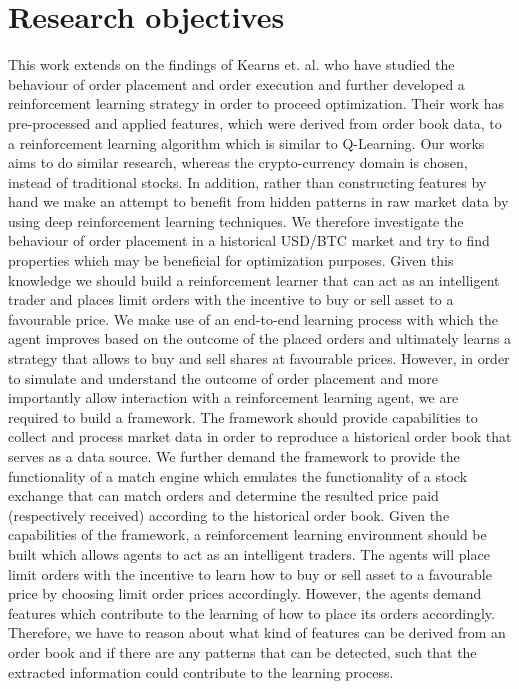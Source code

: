 \section{Research objectives}

This work extends on the findings of Kearns et. al. \cite{nevmyvaka2006reinforcement} who have studied the behaviour of order placement and order execution and further developed a reinforcement learning strategy in order to proceed optimization.
Their work has pre-processed and applied features, which were derived from order book data, to a reinforcement learning algorithm which is similar to Q-Learning.
Our works aims to do similar research, whereas the crypto-currency domain is chosen, instead of traditional stocks.
In addition, rather than constructing features by hand we make an attempt to benefit from hidden patterns in raw market data by using deep reinforcement learning techniques.
We therefore investigate the behaviour of order placement in a historical USD/BTC market and try to find properties which may be beneficial for optimization purposes.
Given this knowledge we should build a reinforcement learner that can act as an intelligent trader and places limit orders with the incentive to buy or sell asset to a favourable price.
We make use of an end-to-end learning process with which the agent improves based on the outcome of the placed orders and ultimately learns a strategy that allows to buy and sell shares at favourable prices.
However, in order to simulate and understand the outcome of order placement and more importantly allow interaction with a reinforcement learning agent, we are required to build a framework.
The framework should provide capabilities to collect and process market data in order to reproduce a historical order book that serves as a data source.
We further demand the framework to provide the functionality of a match engine which emulates the functionality of a stock exchange that can match orders and determine the resulted price paid (respectively received) according to the historical order book.
Given the capabilities of the framework, a reinforcement learning environment should be built which allows agents to act as an intelligent traders.
The agents will place limit orders with the incentive to learn how to buy or sell asset to a favourable price by choosing limit order prices accordingly.
However, the agents demand features which contribute to the learning of how to place its orders accordingly.
Therefore, we have to reason about what kind of features can be derived from an order book and if there are any patterns that can be detected, such that the extracted information could contribute to the learning process.
